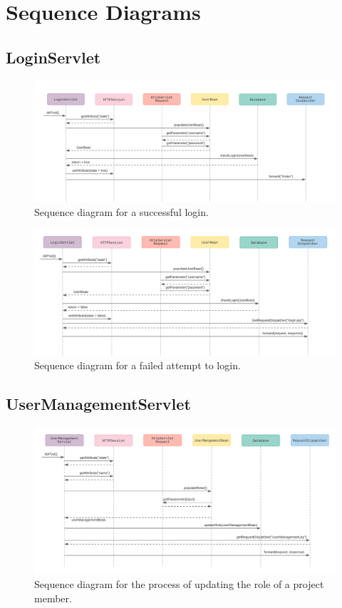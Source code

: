 \documentclass{article}
\begin{document}
\section{Sequence Diagrams}
\subsection{LoginServlet}

\begin{figure}[H]
    \centering
    \includegraphics[scale=0.4]{images/successfulLogin.png}
    \caption{Sequence diagram for a successful login.}
    \label{fig:successfulLogin}
\end{figure}

\begin{figure}[H]
    \centering
    \includegraphics[scale=0.4]{images/failedLogin.png}
    \caption{Sequence diagram for a failed attempt to login.}
    \label{fig:failedLoginAttempt}
\end{figure}

\pagebreak
\subsection{UserManagementServlet}

\begin{figure}[H]
    \centering
    \includegraphics[scale=0.5]{images/updateRole.png}
    \caption{Sequence diagram for the process of updating the role of a project member.}
    \label{fig:successfulLogin}
\end{figure}
\end{document}
